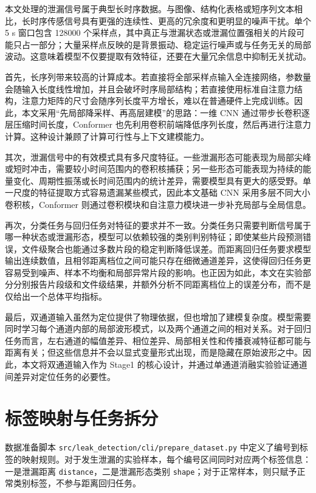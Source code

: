 本文处理的泄漏信号属于典型长时序数据。与图像、结构化表格或短序列文本相比，长时序传感信号具有更强的连续性、更高的冗余度和更明显的噪声干扰。单个 5 s 窗口包含 128000 个采样点，其中真正与泄漏状态或泄漏位置强相关的片段可能只占一部分；大量采样点反映的是背景振动、稳定运行噪声或与任务无关的局部波动。这意味着模型不仅要提取有效特征，还要在大量冗余信息中抑制无关扰动。

首先，长序列带来较高的计算成本。若直接将全部采样点输入全连接网络，参数量会随输入长度线性增加，并且会破坏时序局部结构；若直接使用标准自注意力结构，注意力矩阵的尺寸会随序列长度平方增长，难以在普通硬件上完成训练。因此，本文采用“先局部降采样、再高层建模”的思路：一维 CNN 通过带步长卷积逐层压缩时间长度，Conformer 也先利用卷积前端降低序列长度，然后再进行注意力计算。这种设计兼顾了计算可行性与上下文建模能力。

其次，泄漏信号中的有效模式具有多尺度特征。一些泄漏形态可能表现为局部尖峰或短时冲击，需要较小时间范围内的卷积核捕获；另一些形态可能表现为持续的能量变化、周期性振荡或长时间范围内的统计差异，需要模型具有更大的感受野。单一尺度的特征提取方式容易遗漏某些模式，因此本文基础 CNN 采用多层不同大小卷积核，Conformer 则通过卷积模块和自注意力模块进一步补充局部与全局信息。

再次，分类任务与回归任务对特征的要求并不一致。分类任务只需要判断信号属于哪一种状态或泄漏形态，模型可以依赖较强的类别判别特征；即使某些片段预测错误，文件级聚合也能通过多数片段的稳定判断降低误差。而距离回归任务要求模型输出连续数值，且相邻距离档位之间可能只存在细微通道差异，这使得回归任务更容易受到噪声、样本不均衡和局部异常片段的影响。也正因为如此，本文在实验部分分别报告片段级和文件级结果，并额外分析不同距离档位上的误差分布，而不是仅给出一个总体平均指标。

最后，双通道输入虽然为定位提供了物理依据，但也增加了建模复杂度。模型需要同时学习每个通道内部的局部波形模式，以及两个通道之间的相对关系。对于回归任务而言，左右通道的幅值差异、相位差异、局部相关性和传播衰减特征都可能与距离有关；但这些信息并不会以显式变量形式出现，而是隐藏在原始波形之中。因此，本文将双通道输入作为 Stage1 的核心设计，并通过单通道消融实验验证通道间差异对定位任务的必要性。

\section{标签映射与任务拆分}

数据准备脚本 \texttt{src/leak\_detection/cli/prepare\_dataset.py} 中定义了编号到标签的映射规则。对于发生泄漏的实验样本，每个编号区间同时对应两个标签信息：一是泄漏距离 \texttt{distance}，二是泄漏形态类别 \texttt{shape}；对于正常样本，则只赋予正常类别标签，不参与距离回归任务。

